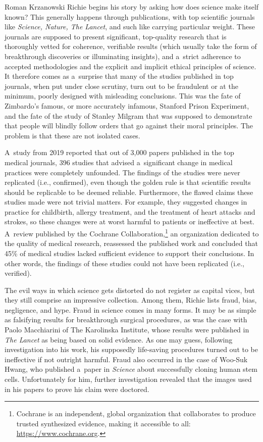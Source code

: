 \begin{newrevengenv}{Roman Krzanowski}
Richie begins his story by asking how does science make itself known? This generally happens through publications, with top scientific journals like \textit{Science, Nature, The Lancet}, and such like carrying particular weight. These journals are supposed to present significant, top-quality research that is thoroughly vetted for coherence, verifiable results (which usually take the form of breakthrough discoveries or illuminating insights), and a~strict adherence to accepted methodologies and the explicit and implicit ethical principles of science. It therefore comes as a~surprise that many of the studies published in top journals, when put under close scrutiny, turn out to be fraudulent or at the minimum, poorly designed with misleading conclusions. This was the fate of Zimbardo's famous, or more accurately infamous, Stanford Prison Experiment, and the fate of the study of Stanley Milgram that was supposed to demonstrate that people will blindly follow orders that go against their moral principles. The problem is that these are not isolated cases.

A~study from 2019 reported that out of 3,000 papers published in the top medical journals, 396 studies that advised a~significant change in medical practices were completely unfounded. The findings of the studies were never replicated (i.e., confirmed), even though the golden rule is that scientific results should be replicable to be deemed reliable. Furthermore, the flawed claims these studies made were not trivial matters. For example, they suggested changes in practice for childbirth, allergy treatment, and the treatment of heart attacks and strokes, so these changes were at worst harmful to patients or ineffective at best. A~review published by the Cochrane Collaboration,\footnote{Cochrane is an independent, global organization that collaborates to produce trusted synthesized evidence, making it accessible to all: \url{https://www.cochrane.org}.} an organization dedicated to the quality of medical research, reassessed the published work and concluded that 45\% of medical studies lacked sufficient evidence to support their conclusions. In other words, the findings of these studies could not have been replicated (i.e., verified).

The evil ways in which science gets distorted do not register as capital vices, but they still comprise an impressive collection. Among them, Richie lists fraud, bias, negligence, and hype. Fraud in science comes in many forms. It may be as simple as falsifying results for breakthrough surgical procedures, as was the case with Paolo Macchiarini of The Karolinska Institute, whose results were published in \textit{The Lancet} as being based on solid evidence. As one may guess, following investigation into his work, his supposedly life-saving procedures turned out to be ineffective if not outright harmful. Fraud also occurred in the case of Woo-Suk Hwang, who published a~paper in \textit{Science} about successfully cloning human stem cells. Unfortunately for him, further investigation revealed that the images used in his papers to prove his claim were doctored.


\end{newrevengenv}
